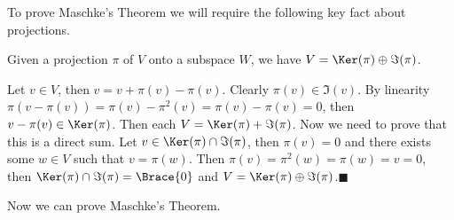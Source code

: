 \documentclass[../Project.tex]{subfiles}
\begin{document}
To prove Maschke's Theorem we will require the following key fact about projections.
\begin{theo}
	Given a projection $\pi$ of $V$ onto a subspace $W$, we have $V = \Ker(\pi) \oplus \Im(\pi)$.
	\label{projtheo}
\end{theo}
\begin{proo*}
	Let $v \in V$, then $v = v + \pi(v) - \pi(v)$. Clearly $\pi(v) \in \Im(v)$. By linearity $\pi(v - \pi(v)) = \pi(v) - \pi^2(v) = \pi(v) - \pi(v) = 0$, then $v - \pi(v) \in \Ker(\pi)$. Then each $V = \Ker(\pi) + \Im(\pi)$. Now we need to prove that this is a direct sum. Let $v \in \Ker(\pi) \cap \Im(\pi)$, then $\pi(v) = 0$ and there exists some $w \in V$ such that $v = \pi(w)$. Then
	$\pi(v) = \pi^2(w) = \pi(w) = v = 0$, then $\Ker(\pi) \cap \Im(\pi) = \Brace{0}$ and $V = \Ker(\pi) \oplus \Im(\pi)$.\hfill $\blacksquare$\\
\end{proo*}

Now we can prove Maschke's Theorem.
\end{document}
